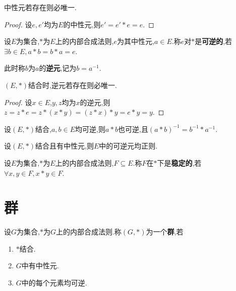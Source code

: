 \begin{prop}
    中性元若存在则必唯一.
\end{prop}

\begin{proof}
    设$e, e'$均为$E$的中性元,则$e' = e' * e = e$.
\end{proof}

\begin{deff}
    设$E$为集合,$*$为$E$上的内部合成法则,$e$为其中性元,$a \in E$.称$e$对$*$是\textbf{可逆的},若$\exists b \in E, a * b = b * a = e$.

    此时称$b$为$a$的\textbf{逆元},记为$b = a^{-1}$.
\end{deff}

\begin{prop}
    $(E, *)$结合时,逆元若存在则必唯一.
\end{prop}

\begin{proof}
    设$x \in E$,$y, z$均为$x$的逆元,则$z = z * e = z * (x * y) = (z * x) * y = e * y = y$.
\end{proof}

\begin{prop}
    设$(E, *)$结合,$a, b \in E$均可逆,则$a * b$也可逆,且$(a * b)^{-1} = b^{-1} * a^{-1}$.
\end{prop}

\begin{prop}
    设$(E, *)$结合且有中性元,则$E$中的可逆元均正则.
\end{prop}

\begin{deff}
    设$E$为集合,$*$为$E$上的内部合成法则,$F \subseteq E$.称$F$在$*$下是\textbf{稳定的},若$\forall x, y \in F, x * y \in F$.
\end{deff}

\section{群}

\begin{deff}
    设$G$为集合,$*$为$G$上的内部合成法则.称$(G, *)$为一个\textbf{群},若
    \begin{enumerate}
        \item $*$结合.\label{def:group1}
        \item $G$中有中性元.\label{def:group2}
        \item $G$中的每个元素均可逆.\label{def:group3}
    \end{enumerate}
\end{deff}

